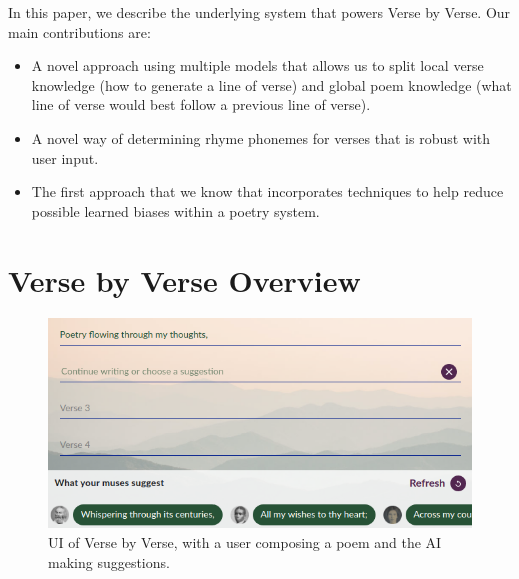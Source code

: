 \documentclass[11pt]{article}
\begin{document}
In this paper, we describe the underlying system that powers Verse by Verse.
Our main contributions are:
\begin{itemize}
    \item A novel approach using multiple models that allows us to split local verse knowledge (how to generate a line of verse) and global poem knowledge (what line of verse would best follow a previous line of verse).
    \item A novel way of determining rhyme phonemes for verses that is robust with user input.
    \item The first approach that we know that incorporates techniques to help reduce possible learned biases within a poetry system.
\end{itemize}

\section{Verse by Verse Overview}

\begin{figure}
  \centering
  \includegraphics[width=.8\textwidth]{vxv_front.png} %
  \caption{UI of Verse by Verse, with a user composing a poem and the AI making suggestions.}
  \label{fig:pic}
\end{figure}


\end{document}
